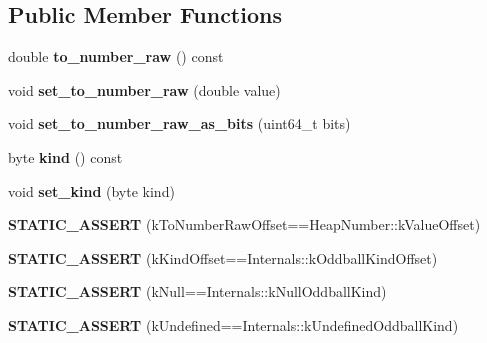 \subsection*{Public Member Functions}
\begin{DoxyCompactItemize}
\item 
\mbox{\label{classv8_1_1internal_1_1Oddball_ab09202526206f3b2f60923fdefb1ffbf}} 
double {\bfseries to\+\_\+number\+\_\+raw} () const
\item 
\mbox{\label{classv8_1_1internal_1_1Oddball_ac159738887b097e944744bb5624dbe90}} 
void {\bfseries set\+\_\+to\+\_\+number\+\_\+raw} (double value)
\item 
\mbox{\label{classv8_1_1internal_1_1Oddball_ad7278e71a5e5e55bed308dd65d10046d}} 
void {\bfseries set\+\_\+to\+\_\+number\+\_\+raw\+\_\+as\+\_\+bits} (uint64\+\_\+t bits)
\item 
\mbox{\label{classv8_1_1internal_1_1Oddball_a142872419b9f45090919571978cff560}} 
byte {\bfseries kind} () const
\item 
\mbox{\label{classv8_1_1internal_1_1Oddball_a23ac73dee2b9eccc79fad51864a92061}} 
void {\bfseries set\+\_\+kind} (byte kind)
\item 
\mbox{\label{classv8_1_1internal_1_1Oddball_a006489f581dec0fe6d2bc2c467fa2817}} 
{\bfseries S\+T\+A\+T\+I\+C\+\_\+\+A\+S\+S\+E\+RT} (k\+To\+Number\+Raw\+Offset==Heap\+Number\+::k\+Value\+Offset)
\item 
\mbox{\label{classv8_1_1internal_1_1Oddball_adaa90c45078014efb0017364c9fc7505}} 
{\bfseries S\+T\+A\+T\+I\+C\+\_\+\+A\+S\+S\+E\+RT} (k\+Kind\+Offset==Internals\+::k\+Oddball\+Kind\+Offset)
\item 
\mbox{\label{classv8_1_1internal_1_1Oddball_a8b098918d70d60336f7cb6686df4cee3}} 
{\bfseries S\+T\+A\+T\+I\+C\+\_\+\+A\+S\+S\+E\+RT} (k\+Null==Internals\+::k\+Null\+Oddball\+Kind)
\item 
\mbox{\label{classv8_1_1internal_1_1Oddball_ac59ae66d1803a5c087b45515d9358891}} 
{\bfseries S\+T\+A\+T\+I\+C\+\_\+\+A\+S\+S\+E\+RT} (k\+Undefined==Internals\+::k\+Undefined\+Oddball\+Kind)
\end{DoxyCompactItemize}
